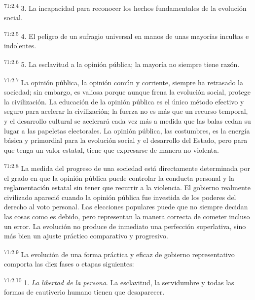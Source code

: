 \documentclass[twoside, 11pt]{book}
\begin{document}
\par
\textsuperscript{71:2.4} 3. La incapacidad para reconocer los hechos fundamentales de la evolución social.

\par
\textsuperscript{71:2.5} 4. El peligro de un sufragio universal en manos de unas mayorías incultas e indolentes.

\par
\textsuperscript{71:2.6} 5. La esclavitud a la opinión pública; la mayoría no siempre tiene razón.

\par
\textsuperscript{71:2.7} La opinión pública, la opinión común y corriente, siempre ha retrasado la sociedad; sin embargo, es valiosa porque aunque frena la evolución social, protege la civilización. La educación de la opinión pública es el único método efectivo y seguro para acelerar la civilización; la fuerza no es más que un recurso temporal, y el desarrollo cultural se acelerará cada vez más a medida que las balas cedan su lugar a las papeletas electorales. La opinión pública, las costumbres, es la energía básica y primordial para la evolución social y el desarrollo del Estado, pero para que tenga un valor estatal, tiene que expresarse de manera no violenta.

\par
\textsuperscript{71:2.8} La medida del progreso de una sociedad está directamente determinada por el grado en que la opinión pública puede controlar la conducta personal y la reglamentación estatal sin tener que recurrir a la violencia. El gobierno realmente civilizado apareció cuando la opinión pública fue investida de los poderes del derecho al voto personal. Las elecciones populares puede que no siempre decidan las cosas como es debido, pero representan la manera correcta de cometer incluso un error. La evolución no produce de inmediato una perfección superlativa, sino más bien un ajuste práctico comparativo y progresivo.

\par
\textsuperscript{71:2.9} La evolución de una forma práctica y eficaz de gobierno representativo comporta las diez fases o etapas siguientes:

\par
\textsuperscript{71:2.10} 1. \textit{La libertad de la persona}. La esclavitud, la servidumbre y todas las formas de cautiverio humano tienen que desaparecer.
\end{document}
